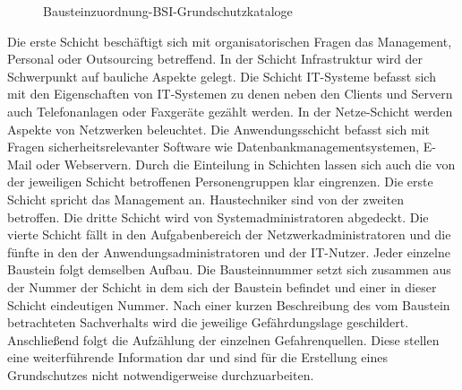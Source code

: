  	\begin{figure}[htbp]
		\centering
		\caption[Bausteinzuordnung-BSI-Grundschutzkataloge]{Bausteinzuordnung-BSI-Grundschutzkataloge}
		\label{Bausteinzuordnung-BSI-Grundschutzkataloge}
	\end{figure}
	\pagebreak
	
	Die erste Schicht beschäftigt sich mit organisatorischen Fragen das Management, Personal oder Outsourcing betreffend. 
	In der Schicht Infrastruktur wird der Schwerpunkt auf bauliche Aspekte gelegt. 
	Die Schicht IT-Systeme befasst sich mit den Eigenschaften von IT-Systemen zu denen neben den Clients und Servern 
	auch Telefonanlagen oder Faxgeräte gezählt werden. In der Netze-Schicht werden Aspekte von Netzwerken beleuchtet. 
	Die Anwendungsschicht befasst sich mit Fragen sicherheitsrelevanter Software wie 
	Datenbankmanagementsystemen, E-Mail oder Webservern.
	Durch die Einteilung in Schichten lassen sich auch die von der jeweiligen Schicht 
	betroffenen Personengruppen klar eingrenzen. 
	Die erste Schicht spricht das Management an. Haustechniker sind von der zweiten betroffen. 
	Die dritte Schicht wird von Systemadministratoren abgedeckt. Die vierte Schicht fällt in den Aufgabenbereich der 
	Netzwerkadministratoren und die fünfte in den der Anwendungsadministratoren und der IT-Nutzer.
	Jeder einzelne Baustein folgt demselben Aufbau. Die Bausteinnummer setzt sich zusammen aus der Nummer 
	der Schicht in dem sich der Baustein befindet und einer in dieser Schicht eindeutigen Nummer. 
	Nach einer kurzen Beschreibung des vom Baustein betrachteten Sachverhalts wird die 
	jeweilige Gefährdungslage geschildert. 
	Anschließend folgt die Aufzählung der einzelnen Gefahrenquellen. 
	Diese stellen eine weiterführende Information dar und sind für die Erstellung eines Grundschutzes 
	nicht notwendigerweise durchzuarbeiten.

